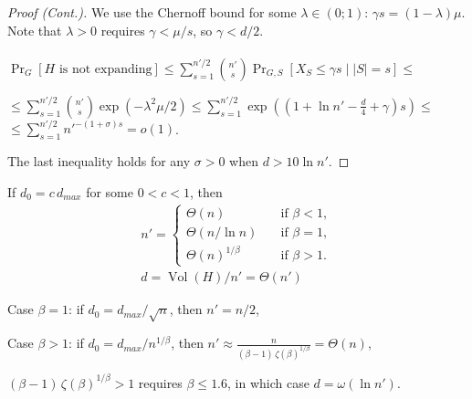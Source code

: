 \documentclass{beamer}
\DeclareMathOperator*{\Vol}{Vol}
\newcommand{\autotitle}{\secname\ifdefempty{\subsecname}{}{~--- \subsecname}}
\newcommand{\smalldisplayskips}{
    \setlength{\abovedisplayskip}{3pt}
    \setlength{\belowdisplayskip}{3pt}}
\begin{document}
\begin{frame}{\autotitle}
    \begin{proof}[Proof (Cont.)]
        \smalldisplayskips
        We use the Chernoff bound for some $\lambda\in(0;1)$: $\gamma s=(1-\lambda)\mu$.
        Note that $\lambda>0$ requires $\gamma<\mu/s$, so $\gamma<d/2$.\\~\\
        
        $\Pr_G[H\text{ is not expanding}]
        \leq\sum_{s=1}^{n'/2}{\binom{n'}{s}\Pr_{G,S}[X_S\leq\gamma s\;|\;|S|=s]}\leq$
        
        $\leq\sum_{s=1}^{n'/2}{\binom{n'}{s}\exp(-\lambda^2\mu/2)}
        \leq\sum_{s=1}^{n'/2}{\exp\left(\left(
            1+\ln n'
            -\frac{d}{4}
            +\gamma
            \right)s\right)}\leq$
        $\leq\sum_{s=1}^{n'/2}{n'^{-(1+\sigma)s}}=o(1)$.

        The last inequality holds for any $\sigma>0$ when $d>10\ln n'$.
    \end{proof}
\end{frame}

\begin{frame}{\autotitle}
    \small\smalldisplayskips
    \begin{lemma}
        If $d_0=c\,d_{max}$ for some $0<c<1$, then
        \begin{gather*}
            n'=
            \begin{cases}
                \Theta(n) & \quad \text{if } \beta<1,\\
                \Theta(n/\ln n) & \quad \text{if } \beta=1,\\
                \Theta\left(n\right)^{1/\beta} & \quad \text{if } \beta>1. %
            \end{cases}\\
            d=\Vol(H)/n'=\Theta(n')
        \end{gather*}
    \end{lemma}

    \begin{lemma}
        Case $\beta=1$: if $d_0=d_{max}/\sqrt{n}$, then $n'=n/2$,
        
        Case $\beta>1$: if $d_0=d_{max}/n^{1/\beta}$, then
        $n'\approx\frac{n}{(\beta-1)\,\zeta(\beta)^{1/\beta}}=\Theta(n)$,
        
        $(\beta-1)\,\zeta(\beta)^{1/\beta}>1$ requires $\beta\leq 1.6$,
        in which case $d=\omega(\ln n')$.
    \end{lemma}
\end{frame}
\end{document}
